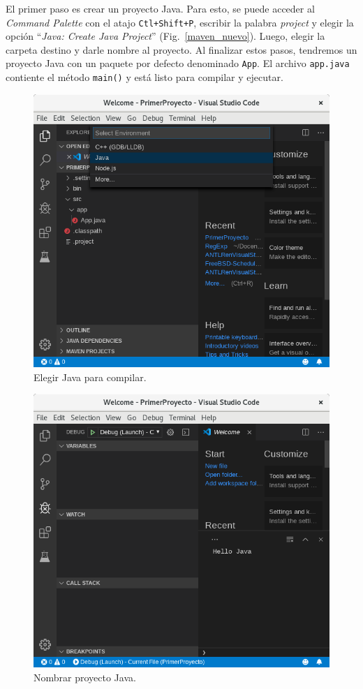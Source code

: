 \documentclass[a5paper,10pt]{article}
\begin{document}
El primer paso es crear un proyecto Java.  Para esto, se puede acceder al \emph{Command Palette} con el atajo \verb|Ctl+Shift+P|, escribir la palabra \emph{project} y elegir la opción ``\emph{Java: Create Java Project}'' (Fig.~\ref{maven_nuevo}). Luego, elegir la carpeta destino y darle nombre al proyecto.  Al finalizar estos pasos, tendremos un proyecto Java con un paquete por defecto denominado \verb|App|.  El archivo \verb|app.java| contiente el método \verb|main()| y está listo para compilar y ejecutar.


\begin{figure}[t]
	\centering
	\includegraphics[width=.95\textwidth]{PrimerCompilacion}
	\caption{Elegir Java para compilar.}
	\label{java_project}
\end{figure}

\begin{figure}[t]
	\centering
	\includegraphics[width=.95\textwidth]{PrimeraEjecucion}
	\caption{Nombrar proyecto Java.}
	\label{hello_java}
\end{figure}
\end{document}
